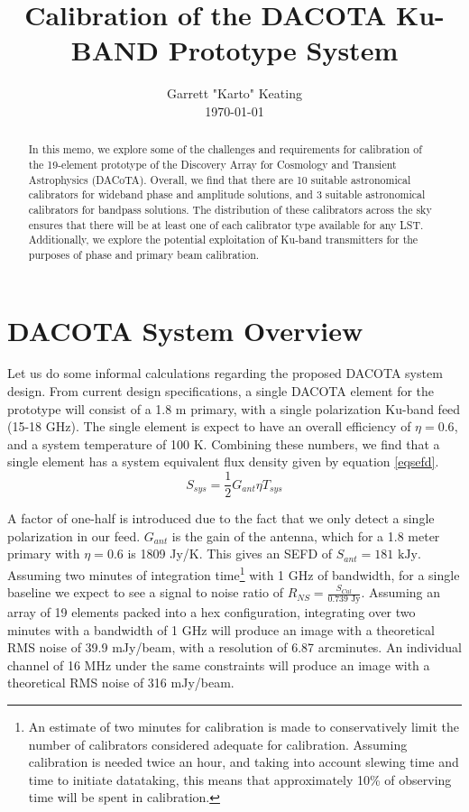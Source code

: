 \documentclass[preprint]{aastex}
\begin{document}
\title{Calibration of the DACOTA Ku-BAND Prototype System}
\author{Garrett "Karto" Keating \\ \today}

\begin{abstract} In this memo, we explore some of the challenges and requirements for calibration of the 19-element prototype of the Discovery Array for Cosmology and Transient Astrophysics (DACoTA). Overall, we find that there are 10 suitable astronomical calibrators for wideband phase and amplitude solutions, and 3 suitable astronomical calibrators for bandpass solutions. The distribution of these calibrators across the sky ensures that there will be at least one of each calibrator type available for any LST. Additionally, we explore the potential exploitation of Ku-band transmitters for the purposes of phase and primary beam calibration.
\end{abstract}

\section{DACOTA System Overview}\label{secoverview}
Let us do some informal calculations regarding the proposed DACOTA system design. From current design specifications, a single DACOTA element for the prototype will consist of a 1.8 m primary, with a single polarization Ku-band feed (15-18 GHz). The single element is expect to have an overall efficiency of $\eta=0.6$, and a system temperature of 100 K. Combining these numbers, we find that a single element has a system equivalent flux density given by equation \ref{eqsefd}.
\begin{equation} \label{eqsefd}
S_{sys}=\frac{1}{2}G_{ant}{\eta}T_{sys}
\end{equation}

\noindent A factor of one-half is introduced due to the fact that we only detect a single polarization in our feed. $G_{ant}$ is the gain of the antenna, which for a 1.8 meter primary with $\eta=0.6$ is 1809 Jy/K. This gives an SEFD of $S_{ant}=181\text{ kJy}$. Assuming two minutes of integration time\footnote{An estimate of two minutes for calibration is made to conservatively limit the number of calibrators considered adequate for calibration. Assuming calibration is needed twice an hour, and taking into account slewing time and time to initiate datataking, this means that approximately 10\% of observing time will be spent in calibration.} with 1 GHz of bandwidth, for a single baseline we expect to see a signal to noise ratio of $R_{NS}=\frac{S_{Cal}}{0.739\text{ Jy}}$. Assuming an array of 19 elements packed into a hex configuration, integrating over two minutes with a bandwidth of 1 GHz will produce an image with a theoretical RMS noise of 39.9 mJy/beam, with a resolution of 6.87 arcminutes. An individual channel of 16 MHz under the same constraints will produce an image with a theoretical RMS noise of 316 mJy/beam. 
\end{document}
